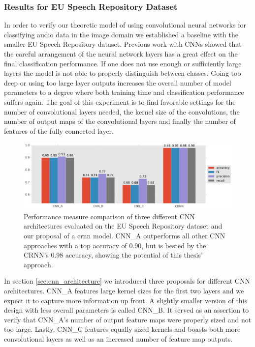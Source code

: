 \subsubsection{Results for EU Speech Repository Dataset}
\label{sec:results_eu}
In order to verify our theoretic model of using convolutional neural networks for classifying audio data in the image domain we established a baseline with the smaller EU Speech Repository dataset. Previous work with CNNs showed that the careful arrangement of the neural network layers has a great effect on the final classification performance. If one does not use enough or sufficiently large layers the model is not able to properly distinguish between classes. Going too deep or using too large layer outputs increases the overall number of model parameters to a degree where both training time and classification performance suffers again. The goal of this experiment is to find favorable settings for the number of convolutional layers needed, the kernel size of the convolutions, the number of output maps of the convolutional layers and finally the number of features of the fully connected layer.

	\begin{figure}[]
  		\centering
    	\includegraphics[width=\textwidth, keepaspectratio]{plots/results_eu_plot.pdf}
    	\caption{Performance measure comparison of three different CNN architectures evaluated on the EU Speech Repository dataset and our proposal of a \ac{crnn} model. CNN\_A outperforms all other CNN approaches with a top accuracy of 0.90, but is bested by the CRNN's 0.98 accuracy, showing the potential of this thesis' approach.}
    	\label{fig:eu_results}
	\end{figure}
	
	In section \ref{sec:cnn_architecture} we introduced three proposals for different CNN architectures. CNN\_A features large kernel sizes for the first two layers and we expect it to capture more information up front. A slightly smaller version of this design with less overall parameters is called CNN\_B. It served as an assertion to verify that CNN\_A's number of output feature maps were properly sized and not too large. Lastly, CNN\_C features equally sized kernels and boasts both more convolutional layers as well as an increased number of feature map outputs.

